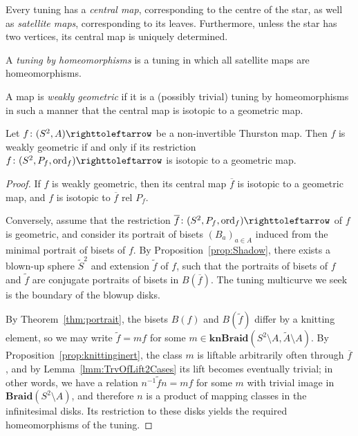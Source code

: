 \documentclass{amsart}
\newcommand\Braid{{\mathbf{Braid}}}
\newcommand\knBraid{{\mathbf{knBraid}}}
\newcommand\wtf{{\widetilde f}}
\newcommand\wtA{{\widetilde A}}
\begin{document}
Every tuning has a \emph{central map}, corresponding to the centre of
the star, as well as \emph{satellite maps}, corresponding to its
leaves. Furthermore, unless the star has two vertices, its central map
is uniquely determined.

\begin{defn}
  A \emph{tuning by homeomorphisms} is a tuning in which all satellite
  maps are homeomorphisms.

  A map is \emph{weakly geometric} if it is a (possibly trivial)
  tuning by homeomorphisms in such a manner that the central map is
  isotopic to a geometric map.
\end{defn}

\begin{thm}\label{thm:tuning}
  Let $f\colon(S^2,A)\selfmap$ be a non-invertible Thurston
  map. Then $f$ is weakly geometric if and only if its restriction
  $f\colon(S^2,P_f,\ord_f)\selfmap $ is isotopic to a geometric map.
\end{thm}
\begin{proof}
  If $f$ is weakly geometric, then its central map $\overline f$ is
  isotopic to a geometric map, and $f$ is isotopic to $\overline f$
  rel $P_f$.

  Conversely, assume that the restriction
  $\overline f\colon(S^2,P_f,\ord_f)\selfmap$ of $f$ is geometric, and
  consider its portrait of bisets $(B_a)_{a\in A}$ induced from the
  minimal portrait of bisets of $f$. By Proposition~\ref{prop:Shadow},
  there exists a blown-up sphere $\widetilde S^2$ and extension
  $\wtf$ of $f$, such that the portraits of bisets of $f$ and
  $\wtf$ are conjugate portraits of bisets in
  $B(\overline f)$. The tuning multicurve we seek is the boundary of
  the blowup disks.

  By Theorem~\ref{thm:portrait}, the bisets $B(f)$ and
  $B(\wtf)$ differ by a knitting element, so we may write
  $\wtf=m f$ for some
  $m\in\knBraid(S^2\setminus A,\wtA\setminus A)$. By
  Proposition~\ref{prop:knittinginert}, the class $m$ is liftable
  arbitrarily often through $\overline f$, and by
  Lemma~\ref{lmm:TrvOfLift2Cases} its lift becomes eventually trivial;
  in other words, we have a relation $n^{-1}\wtf n=m f$ for
  some $m$ with trivial image in $\Braid(S^2\setminus A)$, and
  therefore $n$ is a product of mapping classes in the infinitesimal
  disks. Its restriction to these disks yields the required
  homeomorphisms of the tuning.
\end{proof}
\end{document}
